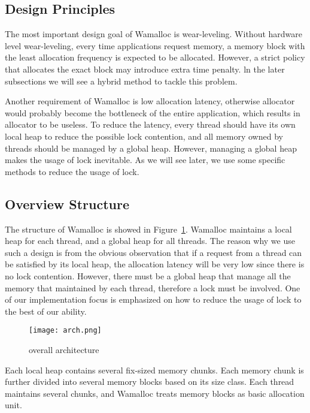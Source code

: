 \documentclass[10pt, conference, compsocconf]{IEEEtran}
\begin{document}
\subsection{Design Principles}

The most important design goal of Wamalloc is wear-leveling. 
Without hardware level wear-leveling, every time applications request memory,
a memory block with the least allocation frequency is expected to be allocated.
However, a strict policy that allocates the exact block may introduce extra time penalty.
ln the later subsections we will see a hybrid method to tackle this problem.

Another requirement of Wamalloc is low allocation latency,
otherwise allocator would probably become the bottleneck of the entire application,
which results in allocator to be useless. 
To reduce the latency, every thread should have its own local heap to reduce the possible lock contention,
and all memory owned by threads should be managed by a global heap.
However, managing a global heap makes the usage of lock inevitable.
As we will see later, we use some specific methods to reduce the usage of lock.

\subsection{Overview Structure}

The structure of Wamalloc is showed in Figure~\ref{fig:arch}.
Wamalloc maintains a local heap for each thread, and a global heap for all threads.
The reason why we use such a design is from the obvious observation that if a request from a thread can be satisfied by its local heap,
the allocation latency will be very low since there is no lock contention.
However, there must be a global heap that manage all the memory that maintained by each thread,
therefore a lock must be involved. 
One of our implementation focus is emphasized on how to reduce the usage of lock to the best of our ability.

\begin{figure}
\centering
\texttt{[image: arch.png]}
\caption{overall architecture}
\label{fig:arch}
\end{figure}

Each local heap contains several fix-sized memory chunks.
Each memory chunk is further divided into several memory blocks based on its size class.
Each thread maintains several chunks, and Wamalloc treats memory blocks as basic allocation unit.
\end{document}
